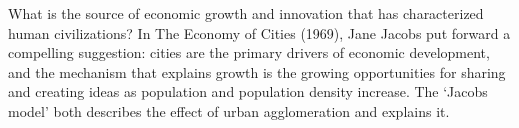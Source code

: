 

What is the source of economic growth and innovation that has characterized human civilizations? In The Economy of Cities (1969), Jane Jacobs \cite{jacobsEconomyCities1969} put forward a compelling suggestion: %
cities are the primary drivers of economic development, and  the mechanism that explains growth is  the growing opportunities for sharing and creating ideas as population and population density increase. The `Jacobs model'  both describes the effect of urban agglomeration and explains it.


